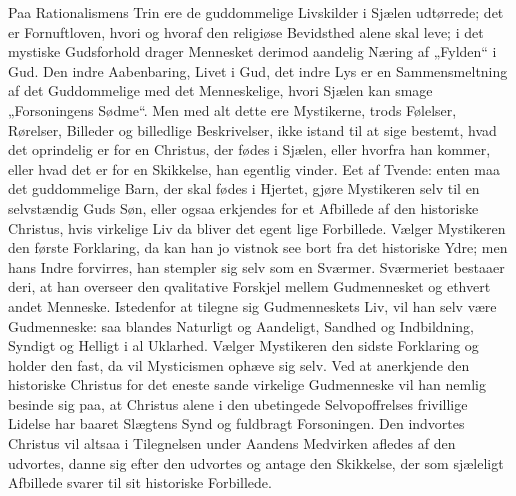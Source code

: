 \documentclass[12pt]{book}
\begin{document}
Paa Rationalismens Trin ere de guddommelige Livskilder i Sjælen
udtørrede; det er Fornuftloven, hvori og hvoraf den religiøse
Bevidsthed alene skal leve; i det mystiske Gudsforhold drager
Mennesket derimod aandelig Næring af „Fylden“ i Gud. Den indre
Aabenbaring, Livet i Gud, det indre Lys er en Sammensmeltning af det
Guddommelige med det Menneskelige, hvori Sjælen kan smage
„Forsoningens Sødme“. Men med alt dette ere Mystikerne, trods
Følelser, Rørelser, Billeder og billedlige Beskrivelser, ikke istand
til at sige bestemt, hvad det oprindelig er for en Christus, der
fødes i Sjælen, eller hvorfra han kommer, eller hvad det er for en
Skikkelse, han egentlig vinder. Eet af Tvende: enten maa det
guddommelige Barn, der skal fødes i Hjertet, gjøre Mystikeren selv
til en selvstændig Guds Søn, eller ogsaa erkjendes for et Afbillede
af den historiske Christus, hvis virkelige Liv da bliver det egent\-
lige Forbillede. Vælger Mystikeren den første Forklaring, da kan han
jo vistnok see bort fra det historiske Ydre; men hans Indre
forvirres, han stempler sig selv som en Sværmer. Sværmeriet bestaaer
deri, at han overseer den qvalitative Forskjel mellem Gudmennesket
og ethvert andet Menneske. Istedenfor at tilegne sig Gudmenneskets
Liv, vil han selv være Gudmenneske: saa blandes Naturligt og
Aandeligt, Sandhed og Indbildning, Syndigt og Helligt i al Uklarhed.
Vælger Mystikeren den sidste Forklaring og holder den fast, da vil
Mysticismen ophæve sig selv. Ved at anerkjende den historiske
Christus for det eneste sande virkelige Gudmenneske vil han nemlig
besinde sig paa, at Christus alene i den ubetingede Selvopoffrelses
frivillige Lidelse har baaret Slægtens Synd og fuldbragt
Forsoningen. Den indvortes Christus vil altsaa i Tilegnelsen under
Aandens Medvirken afledes af den udvortes, danne sig efter den
udvortes og antage den Skikkelse, der som sjæleligt Afbillede svarer
til sit historiske Forbillede.
\end{document}
